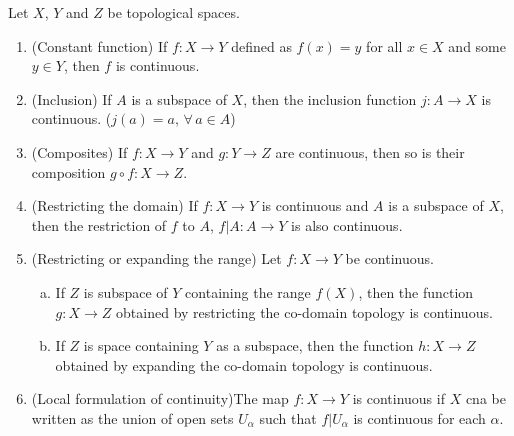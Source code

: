 \documentclass[a4paper,english,12pt]{article}
\begin{document}
\begin{thm} Let $X$, $Y$ and $Z$ be topological spaces.
\begin{enumerate}
\item (Constant function) If $f:X\to Y$ defined as $f(x)=y$ for all $x\in X$ and some $y\in Y$, then $f$ is continuous.
\item (Inclusion) If $A$ is a subspace of $X$, then the inclusion function $j:A\to X$ is continuous. ($j(a)=a,\,\forall\,a\in A$)
\item (Composites) If $f:X\to Y$ and $g:Y\to Z$ are continuous, then so is their composition $g\circ f:X\to Z$.
\item (Restricting the domain) If $f:X\to Y$ is continuous and $A$ is a subspace of $X$, then the restriction of $f$ to $A$, $f|A:A\to Y$ is also continuous.
\item (Restricting or expanding the range) Let $f:X\to Y$ be continuous. 
		\begin{enumerate}[a)]
		\item If $Z$ is subspace of $Y$ containing the range $f(X)$, then the function $g:X\to Z$ obtained by restricting the co-domain topology is continuous.
		\item If $Z$ is space containing $Y$ as a subspace, then the function $h:X\to Z$ obtained by expanding the co-domain topology is continuous.
		\end{enumerate}
\item (Local formulation of continuity)The map $f:X\to Y$ is continuous if $X$ cna be written as the union of open sets $U_{\alpha}$ such that $f|U_{\alpha}$ is continuous for each $\alpha$.
\end{enumerate}
\label{rules}
\end{thm}
\end{document}
